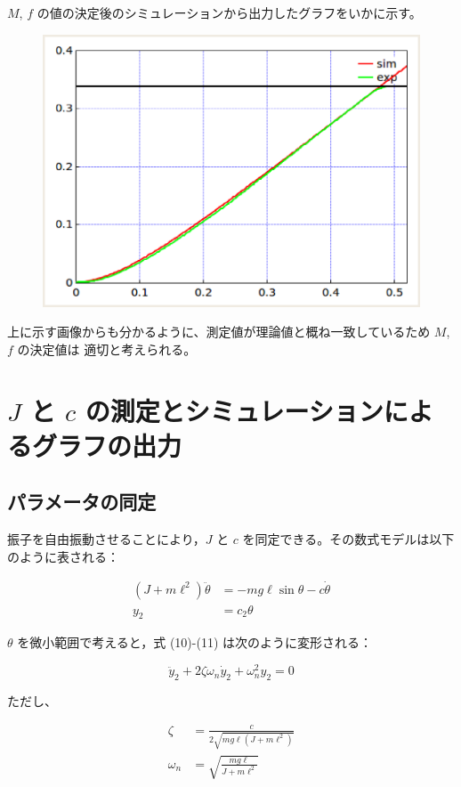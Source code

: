 \documentclass[10pt,a4paper,titlepage]{jreport} %
\begin{document}
$M$, $f$ の値の決定後のシミュレーションから出力したグラフをいかに示す。

\begin{figure}[H] %
  \centering
  \includegraphics[width=0.6\linewidth]{fMDiff.eps} %
\end{figure}

上に示す画像からも分かるように、測定値が理論値と概ね一致しているため $M$, $f$ の決定値は
適切と考えられる。

\section{ $J$ と $c$ の測定とシミュレーションによるグラフの出力}

\subsection{パラメータの同定}

振子を自由振動させることにより，$J$ と $c$ を同定できる。その数式モデルは以下のように表される：

\begin{align}
(J + m\ell^2)\ddot{\theta} &= -mg\ell \sin\theta - c\dot{\theta} \tag{10} \\
y_2 &= c_2 \theta \tag{11}
\end{align}

$\theta$ を微小範囲で考えると，式 (10)-(11) は次のように変形される：

\begin{equation}
\ddot{y}_2 + 2\zeta \omega_n \dot{y}_2 + \omega_n^2 y_2 = 0
\end{equation}

ただし、

\begin{align}
\zeta &= \frac{c}{2\sqrt{mg\ell(J + m\ell^2)}} \\
\omega_n &= \sqrt{\frac{mg\ell}{J + m\ell^2}}
\end{align}
\end{document}
